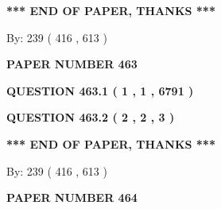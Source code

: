 \documentclass[12pt]{article}
\begin{document}
   
   
   
   
\vspace{1.0in} 
{\textbf{\large{ *** END OF PAPER, THANKS *** }}} 
   
   
\hspace{1.0in} By: 
 239 ( 416 ,  613 )
   
   
   
   
\newpage 
\setcounter{page}{ 
   463001 } 
   
   
   
   
 {\textbf{ \Large{ PAPER NUMBER  463  }}}
   
   
\vspace{0.2in}
   
   
   
   
   
   
 \vspace{0.2in}
 
 
 
 
   
   
  
\vspace{0.2in}
  
{\textbf{\Large{QUESTION
463.1 
 ( 1 , 1 , 6791 )
}}}
  
  
  
\vspace{0.2in}
  
{\textbf{\Large{QUESTION
463.2 
 ( 2 , 2 , 3 )
}}}
  
  
   
   
 \vspace{0.2in}
 
   
   
   
   
\vspace{1.0in} 
{\textbf{\large{ *** END OF PAPER, THANKS *** }}} 
   
   
\hspace{1.0in} By: 
 239 ( 416 ,  613 )
   
   
   
   
\newpage 
\setcounter{page}{ 
   464001 } 
   
   
   
   
 {\textbf{ \Large{ PAPER NUMBER  464  }}}
   
   
\vspace{0.2in}
   
\end{document}
